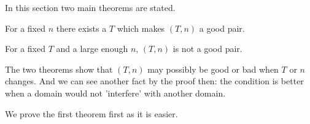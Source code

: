 In this section two main theorems are stated.
	
\begin{thm}
	For a fixed $n$ there exists a $T$ which makes $(T, n)$ a good pair.
\end{thm}
	
\begin{thm}
	For a fixed $T$ and a large enough $n$, $(T, n)$ is not a good pair.
\end{thm}
	
The two theorems show that $(T, n)$ may possibly be good or bad when $T$ 
or $n$ changes. And we can see another fact by the proof then: the 
condition is better when a domain would not 'interfere' with
another domain.\newline
	
We prove the first theorem first as it is easier.
	
